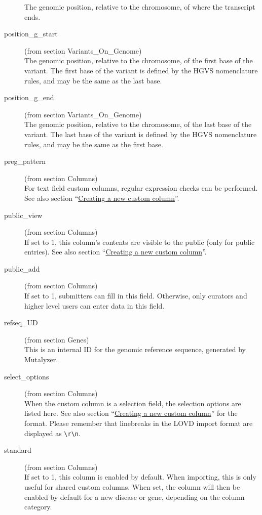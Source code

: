 \documentclass[a4paper,oneside,openany,12pt]{memoir}
\begin{document}
\begin{description}
  The genomic position, relative to the chromosome, of where the transcript ends.
  \item[position\_g\_start] (from section Variants\_On\_Genome)\hfill \\
  The genomic position, relative to the chromosome, of the first base of the variant.
  The first base of the variant is defined by the HGVS nomenclature rules, and may be the same as the last base.
  \item[position\_g\_end] (from section Variants\_On\_Genome)\hfill \\
  The genomic position, relative to the chromosome, of the last base of the variant.
  The last base of the variant is defined by the HGVS nomenclature rules, and may be the same as the first base.
  \item[preg\_pattern] (from section Columns)\hfill \\
  For text field custom columns, regular expression checks can be performed.
  See also section ``\hyperlink{sec:custom_column_create}{Creating a new custom column}''.
  \item[public\_view] (from section Columns)\hfill \\
  If set to 1, this column's contents are visible to the public (only for public entries).
  See also section ``\hyperlink{sec:custom_column_create}{Creating a new custom column}''.
  \item[public\_add] (from section Columns)\hfill \\
  If set to 1, submitters can fill in this field.
  Otherwise, only curators and higher level users can enter data in this field.
  \item[refseq\_UD] (from section Genes)\hfill \\
  This is an internal ID for the genomic reference sequence, generated by Mutalyzer.
  \item[select\_options] (from section Columns)\hfill \\
  When the custom column is a selection field, the selection options are listed here.
  See also section ``\hyperlink{sec:custom_column_create}{Creating a new custom column}'' for the format.
  Please remember that linebreaks in the LOVD import format are displayed as \texttt{\textbackslash{}r\textbackslash{}n}.
  \item[standard] (from section Columns)\hfill \\
  If set to 1, this column is enabled by default.
  When importing, this is only useful for shared custom columns.
  When set, the column will then be enabled by default for a new disease or gene, depending on the column category.

\end{description}
\end{document}
